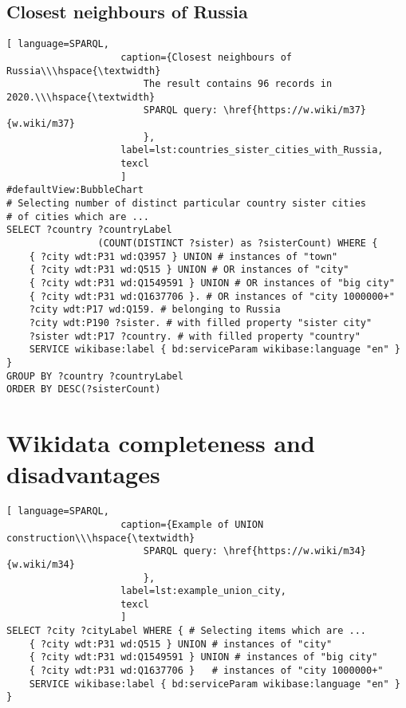\subsection{Closest neighbours of Russia}

\begin{lstlisting}[ language=SPARQL, 
                    caption={Closest neighbours of Russia\\\hspace{\textwidth}
                        The result contains 96 records in 2020.\\\hspace{\textwidth}
                        SPARQL query: \href{https://w.wiki/m37}{w.wiki/m37}
                        },
                    label=lst:countries_sister_cities_with_Russia,
                    texcl 
                    ]
#defaultView:BubbleChart
# Selecting number of distinct particular country sister cities 
# of cities which are ...
SELECT ?country ?countryLabel 
				(COUNT(DISTINCT ?sister) as ?sisterCount) WHERE {                                                
	{ ?city wdt:P31 wd:Q3957 } UNION # instances of "town"
	{ ?city wdt:P31 wd:Q515 } UNION # OR instances of "city"
	{ ?city wdt:P31 wd:Q1549591 } UNION # OR instances of "big city"
	{ ?city wdt:P31 wd:Q1637706 }. # OR instances of "city 1000000+"                                 
	?city wdt:P17 wd:Q159. # belonging to Russia
	?city wdt:P190 ?sister. # with filled property "sister city"
	?sister wdt:P17 ?country. # with filled property "country"
	SERVICE wikibase:label { bd:serviceParam wikibase:language "en" }
}
GROUP BY ?country ?countryLabel
ORDER BY DESC(?sisterCount)
\end{lstlisting}%

\section{Wikidata completeness and disadvantages}

\begin{lstlisting}[ language=SPARQL, 
                    caption={Example of UNION construction\\\hspace{\textwidth}
                        SPARQL query: \href{https://w.wiki/m34}{w.wiki/m34}
                        },
                    label=lst:example_union_city,
                    texcl 
                    ]
SELECT ?city ?cityLabel WHERE { # Selecting items which are ...
	{ ?city wdt:P31 wd:Q515 } UNION # instances of "city"            
	{ ?city wdt:P31 wd:Q1549591 } UNION # instances of "big city"               
	{ ?city wdt:P31 wd:Q1637706 } 	# instances of "city 1000000+"
	SERVICE wikibase:label { bd:serviceParam wikibase:language "en" }
}
\end{lstlisting}%


